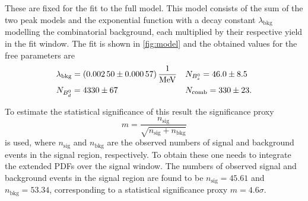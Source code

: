 These are fixed for the fit to the full model. This model consists of the sum of the two peak models and the exponential function with a decay constant $\lambda_\mathrm{bkg}$ modelling the combinatorial background, each multiplied by their respective yield in the fit window. The fit is shown in \autoref{fig:model} and the obtained values for the free parameters are
\begin{align*}
  &\lambda_\mathrm{bkg} = \SI{0.0025 \pm 0.00057}{\per\mega\eV} && N_{B^0_s} = \num{46 \pm 8.5}\\
  &N_{B^0_d} = \num{4330 \pm 67} && N_\mathrm{comb} = \num{330 \pm 23}.
\end{align*}

To estimate the statistical significance of this result the significance proxy
\begin{equation*}
  m = \frac{n_\mathrm{sig}}{\sqrt{n_\mathrm{sig} + n_\mathrm{bkg}}}
\end{equation*}
is used, where $n_\mathrm{sig}$ and $n_\mathrm{bkg}$ are the observed numbers of signal and background events in the signal region, respectively. To obtain these one needs to integrate the extended PDFs over the signal window.
The numbers of observed signal and background events in the signal region are found to be $n_\mathrm{sig} = \num{45.61}$ and $n_\mathrm{bkg} = \num{53.34}$, corresponding to a statistical significance proxy $m =\num{4.6}\sigma$.
